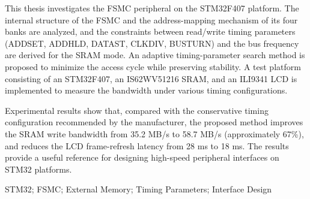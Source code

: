 This thesis investigates the FSMC peripheral on the STM32F407 platform.
The internal structure of the FSMC and the address-mapping mechanism of its
four banks are analyzed, and the constraints between read/write timing
parameters (ADDSET, ADDHLD, DATAST, CLKDIV, BUSTURN) and the bus
frequency are derived for the SRAM mode. An adaptive timing-parameter
search method is proposed to minimize the access cycle while preserving
stability. A test platform consisting of an STM32F407, an IS62WV51216
SRAM, and an ILI9341 LCD is implemented to measure the bandwidth under
various timing configurations.

Experimental results show that, compared with the conservative timing
configuration recommended by the manufacturer, the proposed method
improves the SRAM write bandwidth from 35.2 MB/s to 58.7 MB/s
(approximately 67\%), and reduces the LCD frame-refresh latency from
28 ms to 18 ms. The results provide a useful reference for designing
high-speed peripheral interfaces on STM32 platforms.

\vspace{\baselineskip}
{\fontsize{12pt}{18pt}\selectfont STM32; FSMC; External Memory; Timing Parameters; Interface Design}
